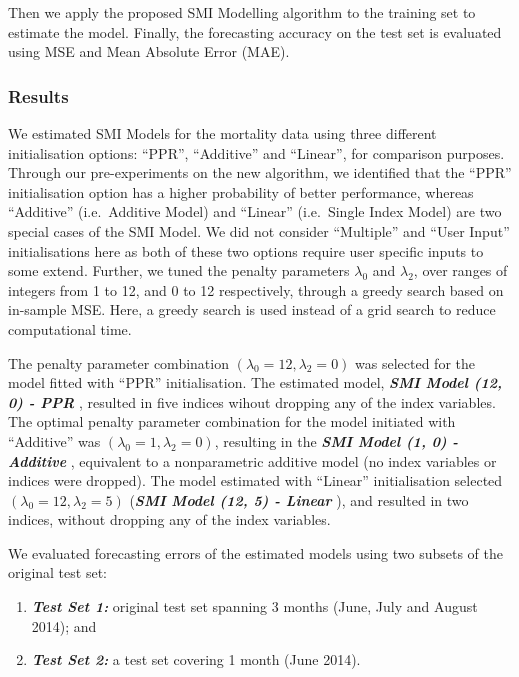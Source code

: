 \documentclass[11pt,a4paper,]{article}
\providecommand{\tightlist}{%
  \setlength{\itemsep}{0pt}\setlength{\parskip}{0pt}}
\begin{document}
Then we apply the proposed SMI Modelling algorithm to the training set
to estimate the model. Finally, the forecasting accuracy on the test set
is evaluated using MSE and Mean Absolute Error (MAE).

\hypertarget{results}{%
\subsubsection{Results}\label{results}}

We estimated SMI Models for the mortality data using three different
initialisation options: ``PPR'', ``Additive'' and ``Linear'', for
comparison purposes. Through our pre-experiments on the new algorithm,
we identified that the ``PPR'' initialisation option has a higher
probability of better performance, whereas ``Additive'' (i.e.~Additive
Model) and ``Linear'' (i.e.~Single Index Model) are two special cases of
the SMI Model. We did not consider ``Multiple'' and ``User Input''
initialisations here as both of these two options require user specific
inputs to some extend. Further, we tuned the penalty parameters
\(\lambda_{0}\) and \(\lambda_{2}\), over ranges of integers from 1 to
12, and 0 to 12 respectively, through a greedy search based on in-sample
MSE. Here, a greedy search is used instead of a grid search to reduce
computational time.

The penalty parameter combination
\((\lambda_{0} = 12, \lambda_{2} = 0)\) was selected for the model
fitted with ``PPR'' initialisation. The estimated model,
\textbf{\emph{SMI Model (12, 0) - PPR }}, resulted in five indices
wihout dropping any of the index variables. The optimal penalty
parameter combination for the model initiated with ``Additive'' was
\((\lambda_{0} = 1, \lambda_{2} = 0)\), resulting in the
\textbf{\emph{SMI Model (1, 0) - Additive }}, equivalent to a
nonparametric additive model (no index variables or indices were
dropped). The model estimated with ``Linear'' initialisation selected
\((\lambda_{0} = 12, \lambda_{2} = 5)\) (\textbf{\emph{SMI Model (12, 5)
- Linear }}), and resulted in two indices, without dropping any of the
index variables.

We evaluated forecasting errors of the estimated models using two
subsets of the original test set:

\begin{enumerate}
\def\labelenumi{\arabic{enumi}.}
\tightlist
\item
  \textbf{\emph{Test Set 1:}} original test set spanning 3 months (June,
  July and August 2014); and
\item
  \textbf{\emph{Test Set 2:}} a test set covering 1 month (June 2014).
\end{enumerate}
\end{document}
